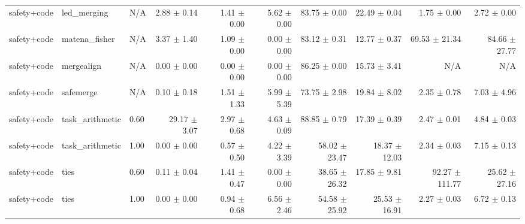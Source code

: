 \documentclass{article}
\begin{document}
\begin{table}[H]
{\begin{tabular}{lllrrrrrrr}
safety+code & led\_merging & N/A & 2.88 $\pm$ 0.14 & 1.41 $\pm$ 0.00 & 5.62 $\pm$ 0.00 & 83.75 $\pm$ 0.00 & 22.49 $\pm$ 0.04 & 1.75 $\pm$ 0.00 & 2.72 $\pm$ 0.00 \\
safety+code & matena\_fisher & N/A & 3.37 $\pm$ 1.40 & 1.09 $\pm$ 0.00 & 0.00 $\pm$ 0.00 & 83.12 $\pm$ 0.31 & 12.77 $\pm$ 0.37 & 69.53 $\pm$ 21.34 & 84.66 $\pm$ 27.77 \\
safety+code & mergealign & N/A & 0.00 $\pm$ 0.00 & 0.00 $\pm$ 0.00 & 0.00 $\pm$ 0.00 & 86.25 $\pm$ 0.00 & 15.73 $\pm$ 3.41 & N/A & N/A \\
safety+code & safemerge & N/A & 0.10 $\pm$ 0.18 & 1.51 $\pm$ 1.33 & 5.99 $\pm$ 5.39 & 73.75 $\pm$ 2.98 & 19.84 $\pm$ 8.02 & 2.35 $\pm$ 0.78 & 7.03 $\pm$ 4.96 \\
safety+code & task\_arithmetic & 0.60 & 29.17 $\pm$ 3.07 & 2.97 $\pm$ 0.68 & 4.63 $\pm$ 0.09 & 88.85 $\pm$ 0.79 & 17.39 $\pm$ 0.39 & 2.47 $\pm$ 0.01 & 4.84 $\pm$ 0.03 \\
safety+code & task\_arithmetic & 1.00 & 0.00 $\pm$ 0.00 & 0.57 $\pm$ 0.50 & 4.22 $\pm$ 3.39 & 58.02 $\pm$ 23.47 & 18.37 $\pm$ 12.03 & 2.34 $\pm$ 0.03 & 7.15 $\pm$ 0.13 \\
safety+code & ties & 0.60 & 0.11 $\pm$ 0.04 & 1.41 $\pm$ 0.47 & 0.00 $\pm$ 0.00 & 38.65 $\pm$ 26.32 & 17.85 $\pm$ 9.81 & 92.27 $\pm$ 111.77 & 25.62 $\pm$ 27.16 \\
safety+code & ties & 1.00 & 0.00 $\pm$ 0.00 & 0.94 $\pm$ 0.68 & 6.56 $\pm$ 2.46 & 54.58 $\pm$ 25.92 & 25.53 $\pm$ 16.91 & 2.27 $\pm$ 0.03 & 6.72 $\pm$ 0.13 \\
\bottomrule
\end{tabular}
}
\end{table}















\end{document}

